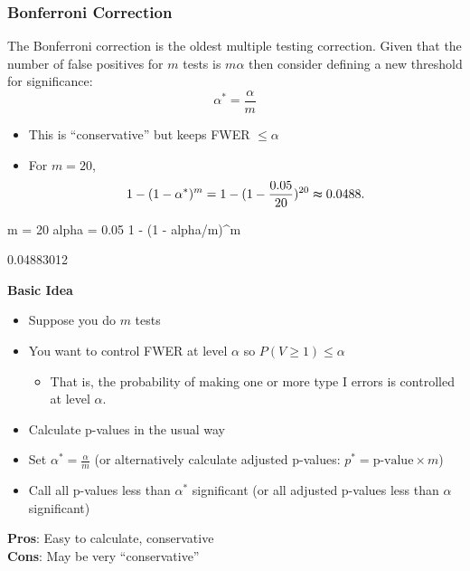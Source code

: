 \documentclass[a4paper]{article}
\begin{document}
\subsubsection{Bonferroni Correction}
The \textcolor{myred}{Bonferroni correction} is the oldest multiple testing correction.
Given that the number of false positives for \( m \) tests is \( m \alpha \) then consider defining a new threshold for significance:
\[
	\alpha^\ast = \frac{\alpha}{m}
\]
\begin{itemize}
	\item This is ``conservative'' but keeps FWER \( \leq \alpha \) 
	\item For \( m = 20 \),
	\[
		1 - (1 - \alpha^\ast)^m = 1 - (1 - \frac{0.05}{20})^{20} \thickapprox 0.0488.
	\]
\end{itemize}
\begin{Schunk}
\begin{Sinput}
m = 20
alpha = 0.05
1 - (1 - alpha/m)^m
\end{Sinput}
\begin{Soutput}
[1] 0.04883012
\end{Soutput}
\end{Schunk}
\textbf{Basic Idea}
\begin{itemize}
	\item Suppose you do \( m \) tests
	\item You want to control FWER at level \( \alpha \) so \( P(V \geq 1) \leq \alpha \)
	\begin{itemize}
		\item That is, the probability of making one or more type I errors is controlled at level \( \alpha \).
	\end{itemize}
	\item Calculate p-values in the usual way
	\item Set \( \alpha^\ast = \frac{\alpha}{m} \) (or alternatively calculate adjusted p-values: \( p^\ast = \text{p-value} \times m \))
	\item Call all p-values less than \( \alpha^\ast \) significant (or all adjusted p-values less than \( \alpha \) significant)
\end{itemize}
\textbf{Pros}: Easy to calculate, conservative\\
\textbf{Cons}: May be very ``conservative''
\end{document}
